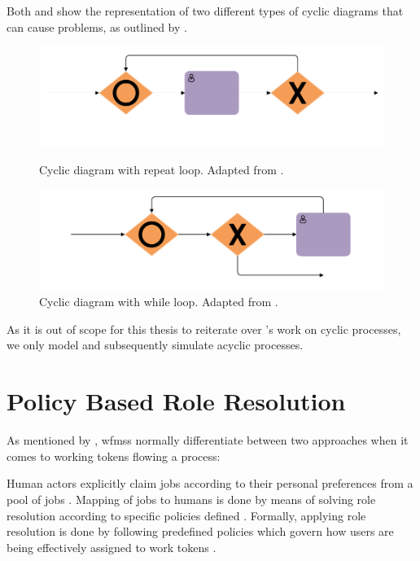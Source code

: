 Both  and  show the representation of two different types of cyclic diagrams that can cause problems, as outlined by \citet{Soerensen2005}.

\begin{figure}[!ht]
	\centering
	\begin{minipage}[b]{0.45\textwidth}
		\includegraphics[width=\textwidth]{img/repeat_loops}
		\caption{Cyclic diagram with repeat loop. Adapted from \citet[p. 12]{Soerensen2005}.}
		\label{fig:repeat_loops}
	\end{minipage}
	\hfill
	\begin{minipage}[b]{0.45\textwidth}
		\includegraphics[width=\textwidth]{img/while_loops}
		\caption{Cyclic diagram with while loop. Adapted from \citet[p. 12]{Soerensen2005}.}
		\label{fig:while_loops}
	\end{minipage}
\end{figure}

As it is out of scope for this thesis to reiterate over \citet{Soerensen2005}'s work on cyclic processes, we only model and subsequently simulate acyclic processes.

\section{Policy Based Role Resolution}
\label{sec:role_resolution_theory}

As mentioned by \citet{Zeng2005}, \glspl{wfms} normally differentiate between two approaches when it comes to working tokens flowing a process:

\begin{enumerate}
	 Human actors explicitly claim jobs according to their personal preferences from a pool of jobs \citep{Zeng2005}.
	 Mapping of jobs to humans is done by means of solving role resolution according to specific policies defined \citep{Zeng2005}. Formally, applying role resolution is done by following predefined policies which govern how users are being effectively assigned to work tokens \citep{Zeng2005}. 
\end{enumerate}

